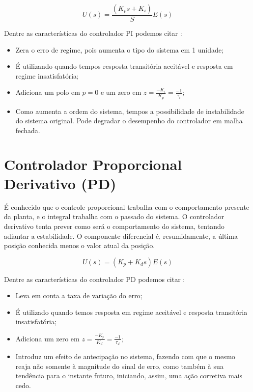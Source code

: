 \documentclass[
	12pt,				%
	openany,			%
	oneside,			%
	a4paper,			%
	english,			%
	french,				%
	spanish,			%
	brazil,				%
	]{abntex2}
\begin{document}
{\begin{equation}
U(s) = \frac{(K_ps+K_i)}{S}E(s)
\end{equation}

Dentre as características do controlador PI podemos citar \cite{meneghetti1}:
\begin{itemize}
    \item Zera o erro de regime, pois aumenta o tipo do sistema em 1 unidade;
    \item É utilizando quando tempos resposta transitória aceitável e resposta em regime insatisfatória;
    \item Adiciona um polo em $p=0$ e um zero em $z = \frac{-K_i}{K_p} = \frac{-1}{\tau_i}$;
    \item Como aumenta a ordem do sistema, tempos a possibilidade de instabilidade do sistema original. Pode degradar o desempenho do controlador em malha fechada.
\end{itemize}

\section{Controlador Proporcional Derivativo (PD)}

É conhecido que o controle proporcional trabalha com o comportamento presente da planta, e o integral trabalha com o passado do sistema. O controlador derivativo tenta prever como será o comportamento do sistema, tentando adiantar a estabilidade. O componente diferencial é, resumidamente, a última posição conhecida menos o valor atual da posição.

\begin{equation}
U(s) = (K_p + K_ds)E(s)
\end{equation}

Dentre as características do controlador PD podemos citar \cite{meneghetti1}:

\begin{itemize}
    \item Leva em conta a taxa de variação do erro;
    \item É utilizado quando temos resposta em regime aceitável e resposta transitória insatisfatória;
    \item Adiciona um zero em $z = \frac{-K_p}{K_d}= \frac{-1}{\tau_d}$;
    \item Introduz um efeito de antecipação no sistema, fazendo com que o mesmo reaja não somente à magnitude do sinal de erro, como também à sua tendência para o instante futuro, iniciando, assim, uma ação corretiva mais cedo.
\end{itemize}

}
\end{document}
